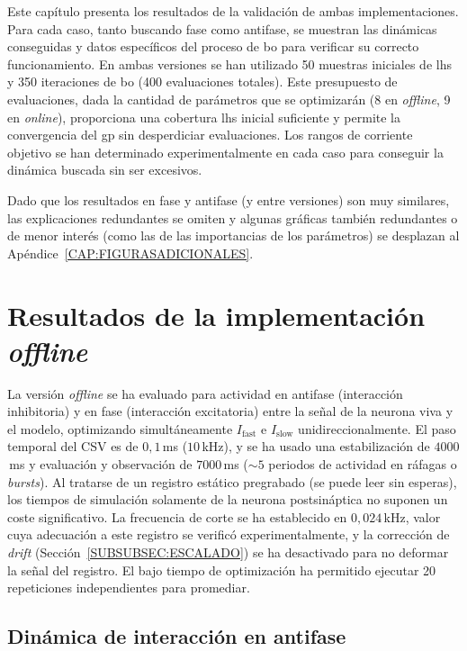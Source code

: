 Este capítulo presenta los resultados de la validación de ambas implementaciones. Para cada caso, tanto buscando fase como antifase, se muestran las dinámicas conseguidas y datos específicos del proceso de \ac{bo} para verificar su correcto funcionamiento. En ambas versiones se han utilizado 50 muestras iniciales de \ac{lhs} y 350 iteraciones de \ac{bo} (400 evaluaciones totales). Este presupuesto de evaluaciones, dada la cantidad de parámetros que se optimizarán (8 en \textit{offline}, 9 en \textit{online}), proporciona una cobertura \ac{lhs} inicial suficiente y permite la convergencia del \ac{gp} sin desperdiciar evaluaciones. Los rangos de corriente objetivo se han determinado experimentalmente en cada caso para conseguir la dinámica buscada sin ser excesivos.

Dado que los resultados en fase y antifase (y entre versiones) son muy similares, las explicaciones redundantes se omiten y algunas gráficas también redundantes o de menor interés (como las de las importancias de los parámetros) se desplazan al Apéndice~\ref{CAP:FIGURASADICIONALES}.


\section{Resultados de la implementación \textit{offline}\label{SEC:RESULTADOS_OFFLINE}}

La versión \textit{offline} se ha evaluado para actividad en antifase (interacción inhibitoria) y en fase (interacción excitatoria) entre la señal de la neurona viva y el modelo, optimizando simultáneamente $I_{\mathrm{fast}}$ e $I_{\mathrm{slow}}$ unidireccionalmente. El paso temporal del CSV es de $0{,}1$\,ms ($10$\,kHz), y se ha usado una estabilización de $4000$\,ms y evaluación y observación de $7000$\,ms ($\sim 5$ periodos de actividad en ráfagas o \textit{bursts}). Al tratarse de un registro estático pregrabado (se puede leer sin esperas), los tiempos de simulación solamente de la neurona postsináptica no suponen un coste significativo. La frecuencia de corte se ha establecido en $0{,}024$\,kHz, valor cuya adecuación a este registro se verificó experimentalmente, y la corrección de \textit{drift} (Sección~\ref{SUBSUBSEC:ESCALADO}) se ha desactivado para no deformar la señal del registro. El bajo tiempo de optimización ha permitido ejecutar 20 repeticiones independientes para promediar.


\subsection{Dinámica de interacción en antifase\label{SUBSEC:OFFLINE_ANTIFASE}}


